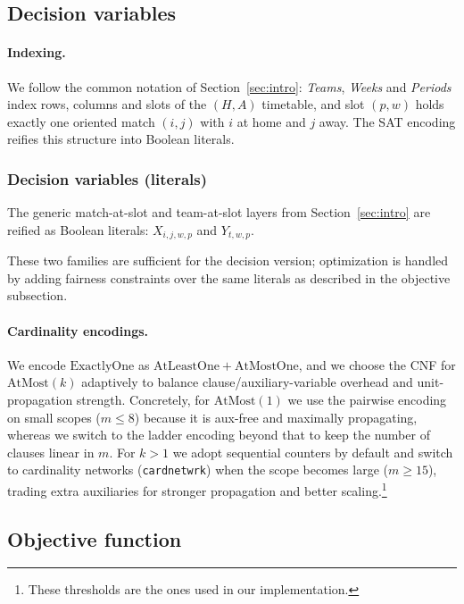 \documentclass{article}
\begin{document}
\subsection{Decision variables}

\paragraph{Indexing.}
We follow the common notation of Section~\ref{sec:intro}: \emph{Teams},
\emph{Weeks} and \emph{Periods} index rows, columns and slots of the
$(H,A)$ timetable, and slot $(p,w)$ holds exactly one oriented match
$(i,j)$ with $i$ at home and $j$ away. The SAT encoding reifies this
structure into Boolean literals.

\subsubsection*{Decision variables (literals)}

The generic match-at-slot and team-at-slot layers from
Section~\ref{sec:intro} are reified as Boolean literals: $X_{i,j,w,p}$ and $Y_{t,w,p}$.

These two families are sufficient for the decision version; optimization is
handled by adding fairness constraints over the same literals as described in
the objective subsection.


\paragraph{Cardinality encodings.}
We encode $\mathrm{ExactlyOne}$ as $\mathrm{AtLeastOne}+\mathrm{AtMostOne}$, and we choose the CNF for $\mathrm{AtMost}(k)$ adaptively to balance clause/auxiliary-variable overhead and unit-propagation strength. Concretely, for $\mathrm{AtMost}(1)$ we use the pairwise encoding on small scopes ($m\!\le\!8$) because it is aux-free and maximally propagating, whereas we switch to the ladder encoding beyond that to keep the number of clauses linear in $m$. For $k>1$ we adopt sequential counters by default and switch to cardinality networks (\texttt{cardnetwrk}) when the scope becomes large ($m\!\ge\!15$), trading extra auxiliaries for stronger propagation and better scaling.\footnote{These thresholds are the ones used in our implementation.}


\subsection{Objective function}
\end{document}
